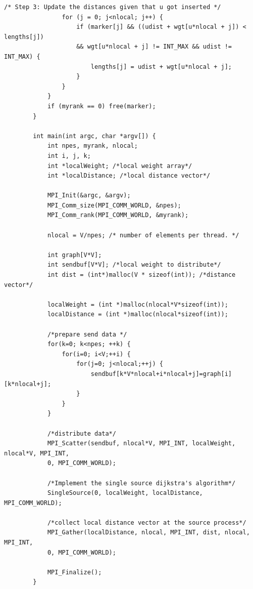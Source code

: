 \begin{lstlisting}[caption={MPI Parallel algorithm for computing SSSP\cite{he2021parallelizing}}, label={listing:ls_sssp_mpi}]
				/* Step 3: Update the distances given that u got inserted */
				for (j = 0; j<nlocal; j++) {
					if (marker[j] && ((udist + wgt[u*nlocal + j]) < lengths[j])
					&& wgt[u*nlocal + j] != INT_MAX && udist != INT_MAX) {
						lengths[j] = udist + wgt[u*nlocal + j];
					}
				}
			}
			if (myrank == 0) free(marker);
		}
	
		int main(int argc, char *argv[]) {
			int npes, myrank, nlocal;
			int i, j, k;
			int *localWeight; /*local weight array*/
			int *localDistance; /*local distance vector*/
			
			MPI_Init(&argc, &argv);
			MPI_Comm_size(MPI_COMM_WORLD, &npes);
			MPI_Comm_rank(MPI_COMM_WORLD, &myrank);
			
			nlocal = V/npes; /* number of elements per thread. */
			
			int graph[V*V];
			int sendbuf[V*V]; /*local weight to distribute*/
			int dist = (int*)malloc(V * sizeof(int)); /*distance vector*/
			
			localWeight = (int *)malloc(nlocal*V*sizeof(int));
			localDistance = (int *)malloc(nlocal*sizeof(int));
			
			/*prepare send data */
			for(k=0; k<npes; ++k) {
				for(i=0; i<V;++i) {
					for(j=0; j<nlocal;++j) {
						sendbuf[k*V*nlocal+i*nlocal+j]=graph[i][k*nlocal+j];
					}
				}
			}
		
			/*distribute data*/
			MPI_Scatter(sendbuf, nlocal*V, MPI_INT, localWeight, nlocal*V, MPI_INT,
			0, MPI_COMM_WORLD); 
			
			/*Implement the single source dijkstra's algorithm*/
			SingleSource(0, localWeight, localDistance, MPI_COMM_WORLD);
			
			/*collect local distance vector at the source process*/
			MPI_Gather(localDistance, nlocal, MPI_INT, dist, nlocal, MPI_INT, 
			0, MPI_COMM_WORLD);
			
			MPI_Finalize();
		}
	\end{lstlisting}
	
